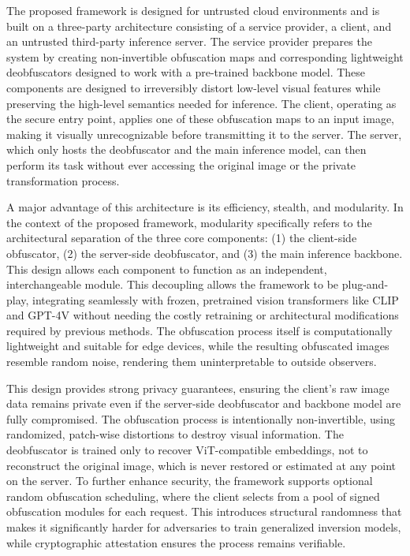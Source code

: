 \documentclass{ieeeaccess}
\begin{document}
{The proposed framework is designed for untrusted cloud environments and is built on a three-party architecture consisting of a service provider, a client, and an untrusted third-party inference server. The service provider prepares the system by creating non-invertible obfuscation maps and corresponding lightweight deobfuscators designed to work with a pre-trained backbone model. These components are designed to irreversibly distort low-level visual features while preserving the high-level semantics needed for inference. The client, operating as the secure entry point, applies one of these obfuscation maps to an input image, making it visually unrecognizable before transmitting it to the server. The server, which only hosts the deobfuscator and the main inference model, can then perform its task without ever accessing the original image or the private transformation process.

A major advantage of this architecture is its efficiency, stealth, and modularity. In the context of the proposed framework, modularity specifically refers to the architectural separation of the three core components: (1) the client-side obfuscator, (2) the server-side deobfuscator, and (3) the main inference backbone. This design allows each component to function as an independent, interchangeable module. This decoupling allows the framework to be plug-and-play, integrating seamlessly with frozen, pretrained vision transformers like CLIP and GPT-4V without needing the costly retraining or architectural modifications required by previous methods. The obfuscation process itself is computationally lightweight and suitable for edge devices, while the resulting obfuscated images resemble random noise, rendering them uninterpretable to outside observers.

This design provides strong privacy guarantees, ensuring the client's raw image data remains private even if the server-side deobfuscator and backbone model are fully compromised. The obfuscation process is intentionally non-invertible, using randomized, patch-wise distortions to destroy visual information. The deobfuscator is trained only to recover ViT-compatible embeddings, not to reconstruct the original image, which is never restored or estimated at any point on the server. To further enhance security, the framework supports optional random obfuscation scheduling, where the client selects from a pool of signed obfuscation modules for each request. This introduces structural randomness that makes it significantly harder for adversaries to train generalized inversion models, while cryptographic attestation ensures the process remains verifiable.}
\end{document}
